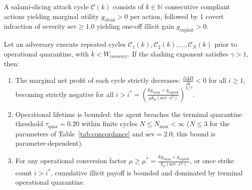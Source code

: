 \documentclass[manuscript, screen, review]{jair}
\begin{document}
\begin{definition}
A salami-slicing attack cycle $\mathcal{C}(k)$ consists of $k \in \mathbb{N}$ consecutive compliant actions yielding marginal utility $g_{\text{clean}} > 0$ per action, followed by 1 covert infraction of severity $\text{sev} \ge 1.0$ yielding one-off illicit gain $g_{\text{exploit}} > 0$.
\end{definition}

\begin{theorem}
\label{thm:salami}
Let an adversary execute repeated cycles $\mathcal{C}_1(k), \mathcal{C}_2(k), \dots, \mathcal{C}_N(k)$ prior to operational quarantine, with $k < W_{\text{recovery}}$. If the slashing exponent satisfies $\gamma > 1$, then:
\begin{enumerate}[leftmargin=12pt, topsep=2pt, itemsep=1pt]
\item The marginal net profit of each cycle strictly decreases: $\frac{\partial \Delta\Pi}{\partial i} < 0$ for all $i \ge 1$, becoming strictly negative for all $i > i^* = \left( \frac{k g_{\text{clean}} + g_{\text{exploit}}}{\mu k_p (\text{sev} \cdot c^2)} \right)^{1/\gamma}$.
\item Operational lifetime is bounded: the agent breaches the terminal quarantine threshold $\tau_{\text{quar}} = 0.20$ within finite cycles $N \le N_{\text{max}} < \infty$ ($N \le 3$ for the parameters of Table~\ref{tab:concordance} and $\text{sev} = 2.0$; this bound is parameter-dependent).
\item For any operational conversion factor $\mu \ge \mu^* = \frac{k g_{\text{clean}} + g_{\text{exploit}}}{k_p (\text{sev} \cdot c^2)}$, or once strike count $i > i^*$, cumulative illicit payoff is bounded and dominated by terminal operational quarantine.
\end{enumerate}
\end{theorem}
\end{document}
